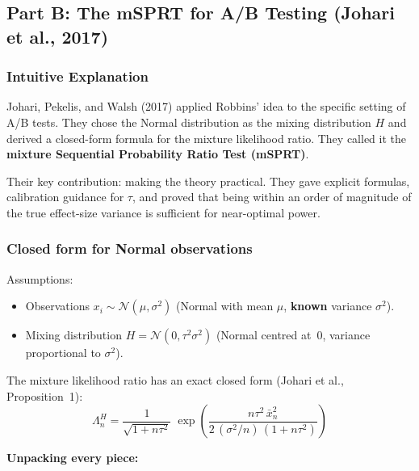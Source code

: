 \documentclass[12pt, a4paper]{article}
\newcommand{\LR}{\Lambda}              %
\begin{document}
\subsection{Part B: The mSPRT for A/B Testing (Johari et al., 2017)}

\subsubsection*{Intuitive Explanation}

\begin{intuition}
Johari, Pekelis, and Walsh (2017) applied Robbins' idea to the specific
setting of A/B tests.  They chose the Normal distribution as the mixing
distribution $H$ and derived a closed-form formula for the mixture likelihood
ratio.  They called it the \textbf{mixture Sequential Probability Ratio Test
(mSPRT)}.

Their key contribution: making the theory practical.  They gave explicit
formulas, calibration guidance for $\tau$, and proved that being within
an order of magnitude of the true effect-size variance is sufficient for
near-optimal power.
\end{intuition}

\subsubsection*{Closed form for Normal observations}

Assumptions:
\begin{itemize}[nosep]
  \item Observations $x_i \sim \mathcal{N}(\mu, \sigma^2)$
        (Normal with mean $\mu$, \textbf{known} variance $\sigma^2$).
  \item Mixing distribution $H = \mathcal{N}(0, \tau^2\sigma^2)$
        (Normal centred at~0, variance proportional to $\sigma^2$).
\end{itemize}

The mixture likelihood ratio has an exact closed form (Johari et al.,
Proposition~1):
\[
  \boxed{\LR_n^{H}
  = \frac{1}{\sqrt{1 + n\tau^2}}
    \;\exp\!\left(
      \frac{n\tau^2\, \bar{x}_n^2}
           {2\,(\sigma^2/n)\,(1 + n\tau^2)}
    \right)}
\]

\textbf{Unpacking every piece:}
\end{document}
